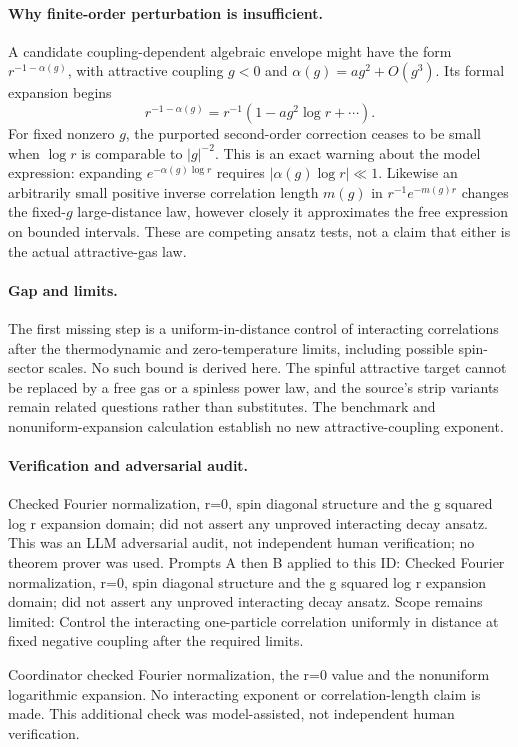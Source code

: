 \documentclass[11pt]{article}
\begin{document}
\paragraph{Why finite-order perturbation is insufficient.}A candidate coupling-dependent algebraic envelope might have the form \(r^{-1-\alpha(g)}\), with attractive coupling \(g<0\) and \(\alpha(g)=ag^2+O(g^3)\). Its formal expansion begins
\[r^{-1-\alpha(g)}=r^{-1}\left(1-ag^2\log r+\cdots\right).
\]
For fixed nonzero \(g\), the purported second-order correction ceases to be small when \(\log r\) is comparable to \(|g|^{-2}\). This is an exact warning about the model expression: expanding \(e^{-\alpha(g)\log r}\) requires \(|\alpha(g)\log r|\ll1\). Likewise an arbitrarily small positive inverse correlation length \(m(g)\) in \(r^{-1}e^{-m(g)r}\) changes the fixed-\(g\) large-distance law, however closely it approximates the free expression on bounded intervals. These are competing ansatz tests, not a claim that either is the actual attractive-gas law.
\paragraph{Gap and limits.}The first missing step is a uniform-in-distance control of interacting correlations after the thermodynamic and zero-temperature limits, including possible spin-sector scales. No such bound is derived here. The spinful attractive target cannot be replaced by a free gas or a spinless power law, and the source's strip variants remain related questions rather than substitutes. The benchmark and nonuniform-expansion calculation establish no new attractive-coupling exponent.

\paragraph{Verification and adversarial audit.}
Checked Fourier normalization, r=0, spin diagonal structure and the g squared log r expansion domain; did not assert any unproved interacting decay ansatz. This was an LLM adversarial audit, not independent human verification; no theorem prover was used. Prompts A then B applied to this ID: Checked Fourier normalization, r=0, spin diagonal structure and the g squared log r expansion domain; did not assert any unproved interacting decay ansatz. Scope remains limited: Control the interacting one-particle correlation uniformly in distance at fixed negative coupling after the required limits.

Coordinator checked Fourier normalization, the r=0 value and the nonuniform logarithmic expansion. No interacting exponent or correlation-length claim is made. This additional check was model-assisted, not independent human verification.
\end{document}
